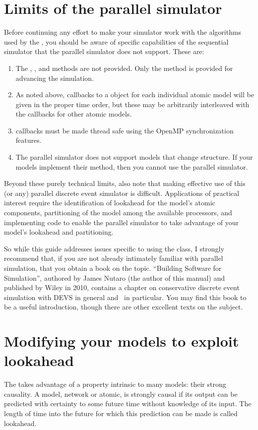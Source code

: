 \section{Limits of the parallel simulator}
Before continuing any effort to make your simulator work with the algorithms used by the , you should be aware of specific capabilities of the sequential simulator that the parallel simulator does not support. These are:
\begin{enumerate}
\item The , , and  methods are not provided. Only the  method is provided for advancing the simulation.
\item As noted above, callbacks to a  object for each individual atomic model will be given in the proper time order, but these may be arbitrarily interleaved with the callbacks for other atomic models.
\item {} callbacks must be made thread safe using the OpenMP synchronization features.
\item The parallel simulator does not support models that change structure. If your models implement their  method, then you cannot use the parallel simulator.
\end{enumerate}

Beyond these purely technical limits, also note that making effective use of this (or any) parallel discrete event simulator is difficult. Applications of practical interest require the identification of lookahead for the model's atomic components, partitioning of the model among the available processors, and implementing code to enable the parallel simulator to take advantage of your model's lookahead and partitioning.

So while this guide addresses issues specific to using the  class, I strongly recommend that, if you are not already intimately familiar with parallel simulation, that you obtain a book on the topic. ``Building Software for Simulation'', authored by James Nutaro (the author of this manual) and published by Wiley in 2010, contains a chapter on conservative discrete event simulation with DEVS in general and \adevs\ in particular. You may find this book to be a useful introduction, though there are other excellent texts on the subject.

\section{Modifying your models to exploit lookahead}
\label{sect:lookahead}
The  takes advantage of a property intrinsic to many models: their strong causality. A model, network or atomic, is strongly causal if its output can be predicted with certainty to some future time without knowledge of its input. The length of time into the future for which this prediction can be made is called lookahead.


